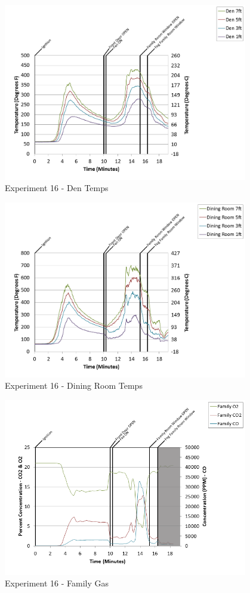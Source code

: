 \documentclass{article}
\begin{document}
\begin{appendices}
\begin{figure}[h!]
	\centering
	\includegraphics[height=3.05in]{0_Images/Results_Charts/Exp_16_Charts/DenTemps.png}
	\caption{Experiment 16 - Den Temps}
\end{figure}

\clearpage

\begin{figure}[h!]
	\centering
	\includegraphics[height=3.05in]{0_Images/Results_Charts/Exp_16_Charts/DiningRoomTemps.png}
	\caption{Experiment 16 - Dining Room Temps}
\end{figure}


\begin{figure}[h!]
	\centering
	\includegraphics[height=3.05in]{0_Images/Results_Charts/Exp_16_Charts/FamilyGas.png}
	\caption{Experiment 16 - Family Gas}
\end{figure}


\end{appendices}
\end{document}
